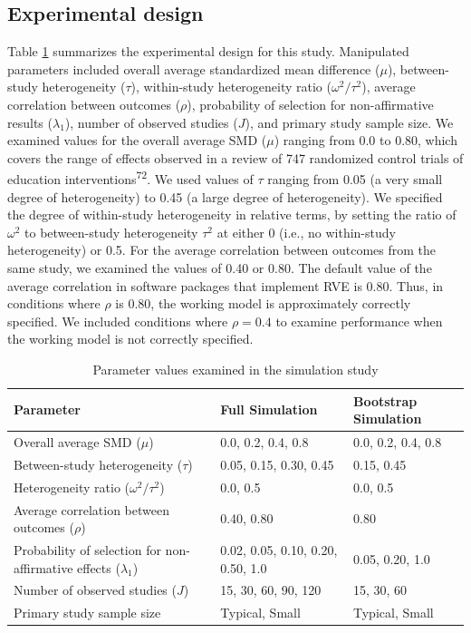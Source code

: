 \documentclass[
  man, donotrepeattitle,floatsintext]{apa7}
\begin{document}
\subsection{Experimental design}\label{experimental-design}

Table \ref{tab:sim-design} summarizes the experimental design for this study.
Manipulated parameters included overall average standardized mean difference
(\(\mu\)), between-study heterogeneity (\(\tau\)), within-study heterogeneity ratio
(\(\omega^2 / \tau^2\)), average correlation between outcomes (\(\rho\)),
probability of selection for non-affirmative results (\(\lambda_1\)), number of observed studies (\(J\)), and primary study sample size.
We examined values for the overall average SMD (\(\mu\)) ranging from 0.0 to 0.80, which covers the range of effects observed in a review of 747 randomized control trials of education interventions\textsuperscript{72}.
We used values of \(\tau\) ranging from 0.05 (a very small degree of heterogeneity) to 0.45 (a large degree of heterogeneity).
We specified the degree of within-study heterogeneity in relative terms, by setting the ratio of \(\omega^2\) to between-study heterogeneity \(\tau^2\) at either 0 (i.e., no within-study heterogeneity) or 0.5.
For the average correlation between outcomes from the same study, we examined the values of 0.40 or 0.80. The default value of the average
correlation in software packages that implement RVE is 0.80.
Thus, in conditions where \(\rho\) is 0.80, the working model is approximately correctly specified.
We included conditions where \(\rho = 0.4\) to examine performance when the working model is not correctly specified.

\begin{table}[tb]
\centering
\caption{\label{tab:sim-design}Parameter values examined in the simulation study}
\centering
\begin{tabular}[t]{>{\raggedright\arraybackslash}p{2.5in}ll}
\toprule
Parameter & Full Simulation & Bootstrap Simulation\\
\midrule
Overall average SMD ($\mu$) & 0.0, 0.2, 0.4, 0.8 & 0.0, 0.2, 0.4, 0.8\\
Between-study heterogeneity ($\tau$) & 0.05, 0.15, 0.30, 0.45 & 0.15, 0.45\\
Heterogeneity ratio ($\omega^2 / \tau^2$) & 0.0, 0.5 & 0.0, 0.5\\
Average correlation between outcomes ($\rho$) & 0.40, 0.80 & 0.80\\
Probability of selection for non-affirmative effects ($\lambda_1$) & 0.02, 0.05, 0.10, 0.20, 0.50, 1.0 & 0.05, 0.20, 1.0\\
\addlinespace
Number of observed studies ($J$) & 15, 30, 60, 90, 120 & 15, 30, 60\\
Primary study sample size & Typical, Small & Typical, Small\\
\bottomrule
\end{tabular}
\end{table}
\end{document}
